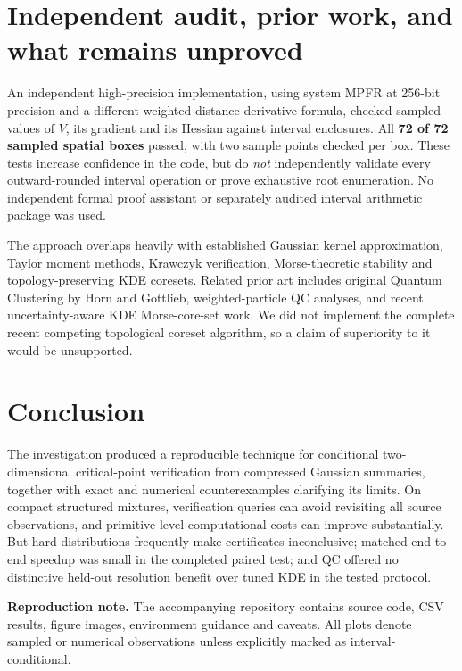 \documentclass[10pt,a4paper]{article}
\begin{document}
\section{Independent audit, prior work, and what remains unproved}
An independent high-precision implementation, using system MPFR at 256-bit precision and a different weighted-distance derivative formula, checked sampled values of $V$, its gradient and its Hessian against interval enclosures. All \textbf{72 of 72 sampled spatial boxes} passed, with two sample points checked per box. These tests increase confidence in the code, but do \emph{not} independently validate every outward-rounded interval operation or prove exhaustive root enumeration. No independent formal proof assistant or separately audited interval arithmetic package was used.

The approach overlaps heavily with established Gaussian kernel approximation, Taylor moment methods, Krawczyk verification, Morse-theoretic stability and topology-preserving KDE coresets. Related prior art includes original Quantum Clustering by Horn and Gottlieb, weighted-particle QC analyses, and recent uncertainty-aware KDE Morse-core-set work. We did not implement the complete recent competing topological coreset algorithm, so a claim of superiority to it would be unsupported.

\section{Conclusion}
The investigation produced a reproducible technique for conditional two-dimensional critical-point verification from compressed Gaussian summaries, together with exact and numerical counterexamples clarifying its limits. On compact structured mixtures, verification queries can avoid revisiting all source observations, and primitive-level computational costs can improve substantially. But hard distributions frequently make certificates inconclusive; matched end-to-end speedup was small in the completed paired test; and QC offered no distinctive held-out resolution benefit over tuned KDE in the tested protocol.


\vspace{2mm}
{\small\sffamily\color{muted}\textbf{Reproduction note.} The accompanying repository contains source code, CSV results, figure images, environment guidance and caveats. All plots denote sampled or numerical observations unless explicitly marked as interval-conditional.}


\newpage
\end{document}
